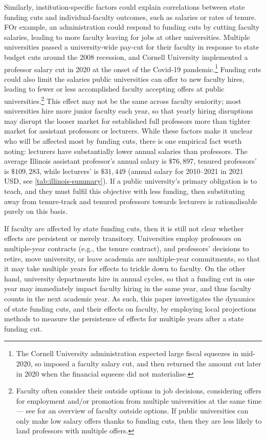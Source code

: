 Similarly, institution-specific factors could explain correlations between state funding cuts and individual-faculty outcomes, such as salaries or rates of tenure.
FOr example, an administration could respond to funding cuts by cutting faculty salaries, leading to more faculty leaving for jobs at other universities.
Multiple universities passed a university-wide pay-cut for their faculty in response to state budget cuts around the 2008 recession, and Cornell University implemented a professor salary cut in 2020 at the onset of the Covid-19 pandemic.\footnote{
    The Cornell University administration expected large fiscal squeezes in mid-2020, so imposed a faculty salary cut, and then returned the amount cut later in 2020 when the financial squeeze did not materialise.
}
Funding cuts could also limit the salaries public universities can offer to new faculty hires, leading to fewer or less accomplished faculty accepting offers at public universities.\footnote{
    Faculty often consider their outside options in job decisions, considering offers for employment and/or promotion from multiple universities at the same time --- see \cite{blackaby2005} for an overview of faculty outside options.
    If public universities can only make low salary offers thanks to funding cuts, then they are less likely to land professors with multiple offers.
}
This effect may not be the same across faculty seniority; most universities hire more junior faculty each year, so that yearly hiring disruptions may disrupt the looser market for established full professors more than tighter market for assistant professors or lecturers.
While these factors make it unclear who will be affected most by funding cuts, there is one empirical fact worth noting: lecturers have substantially lower annual salaries than professors.
The average Illinois assistant professor's annual salary is $\$76,897$, tenured professors' is $\$109,283$, while lecturers' is $\$31,449$ (annual salary for 2010--2021 in 2021 USD, see \autoref{tab:illinois-summary}).
If a public university's primary obligation is to teach, and they must fulfil this objective with less funding, then substituting away from tenure-track and tenured professors towards lecturers is rationalisable purely on this basis.

If faculty are affected by state funding cuts, then it is still not clear whether effects are persistent or merely transitory.
Universities employ professors on multiple-year contracts (e.g., the tenure contract), and professors' decisions to retire, move university, or leave academia are multiple-year commitments, so that it may take multiple years for effects to trickle down to faculty.
On the other hand, university departments hire in annual cycles, so that a funding cut in one year may immediately impact faculty hiring in the same year, and thus faculty counts in the next academic year.
As such, this paper investigates the dynamics of state funding cuts, and their effects on faculty, by employing local projections methods to measure the persistence of effects for multiple years after a state funding cut.
